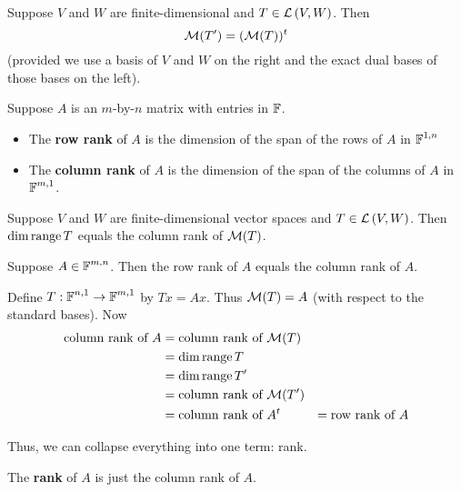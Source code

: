 \begin{theorem}
   Suppose $V$ and $W$ are finite-dimensional and $T \in \mathcal{L} \left( V, W \right)$. Then
   \[ \mathcal{M}(T') = (\mathcal{M}(T))^t \]
   (provided we use a basis of $V$ and $W$ on the right and the exact
   dual bases of those bases on the left).
\end{theorem}

\begin{definition} 
   Suppose $A$ is an $m$-by-$n$ matrix with entries in $\operatorname{\mathbb{F}}$.
   \begin{itemize}
      \item The \textbf{row rank} of $A$ is the dimension of the span of the rows of $A$ in $\operatorname{\mathbb{F}}^{1, n}$
      \item The \textbf{column rank} of $A$ is the dimension of the span of the columns of $A$ in $\operatorname{\mathbb{F}}^{m, 1}$.
   \end{itemize}
\end{definition}

\begin{theorem} 
   Suppose $V$ and $W$ are finite-dimensional vector spaces and $T \in \mathcal{L} \left( V, W \right)$.
   Then $\dim \operatorname{range} T$ equals the column rank of $\mathcal{M}(T)$.
\end{theorem}

\begin{theorem}
   Suppose $A \in \operatorname{\mathbb{F}}^{m, n}$. Then the row rank of $A$ equals the column rank
   of $A$.

   \begin{proof*}
      Define $T: \operatorname{\mathbb{F}}^{n, 1} \to \operatorname{\mathbb{F}}^{m, 1}$ by $Tx = Ax$. Thus $\mathcal{M}(T) = A$ (with
      respect to the standard bases). Now
      \begin{align*}
         \text{column rank of $A$} &= \text{column rank of $\mathcal{M}(T)$} \\
         &= \dim \operatorname{range} T \\
         &= \dim \operatorname{range} T' \\
         &= \text{column rank of $\mathcal{M}(T')$} \\
         &= \text{column rank of $A^t$}
         &= \text{row rank of $A$}
      \end{align*}
   \end{proof*}
\end{theorem}

Thus, we can collapse everything into one term: rank.
\begin{definition} [Rank]
   The \textbf{rank} of $A$ is just the column rank of $A$.
\end{definition}
\endinput